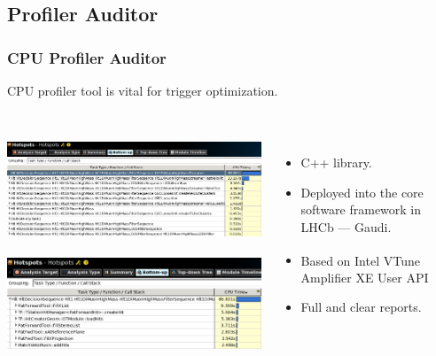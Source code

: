 \documentclass{beamer}
\begin{document}
\subsection{Profiler Auditor}
\begin{frame}
\frametitle{CPU Profiler Auditor}
CPU profiler tool is vital for trigger optimization.\\~\\
\begin{columns}[c]
\includegraphics[width=\textwidth]{images/cpu01.png}\\~\\
\includegraphics[width=\textwidth]{images/cpu02.png}
\begin{itemize}
    \item C++ library.
    \item Deployed into the core software framework in LHCb --- Gaudi.
    \item Based on Intel\textsuperscript{\textregistered} VTune\texttrademark
    Amplifier XE User API
    \item Full and clear reports.
\end{itemize}
\end{columns}
\end{frame}
\end{document}
